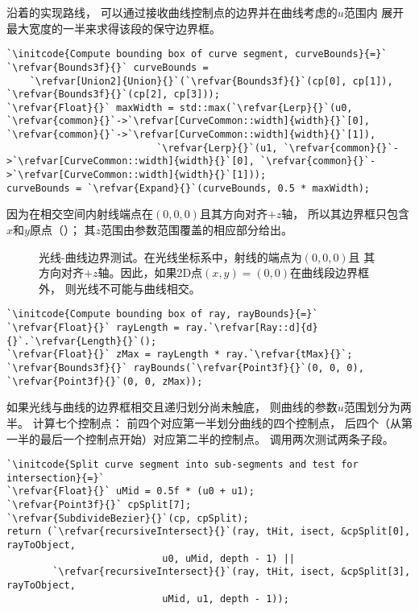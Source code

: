 沿着的实现路线，
可以通过接收曲线控制点的边界并在曲线考虑的$u$范围内
展开最大宽度的一半来求得该段的保守边界框。
\begin{lstlisting}
`\initcode{Compute bounding box of curve segment, curveBounds}{=}`
`\refvar{Bounds3f}{}` curveBounds =
    `\refvar[Union2]{Union}{}`(`\refvar{Bounds3f}{}`(cp[0], cp[1]), `\refvar{Bounds3f}{}`(cp[2], cp[3]));
`\refvar{Float}{}` maxWidth = std::max(`\refvar{Lerp}{}`(u0, `\refvar{common}{}`->`\refvar[CurveCommon::width]{width}{}`[0], `\refvar{common}{}`->`\refvar[CurveCommon::width]{width}{}`[1]),
                          `\refvar{Lerp}{}`(u1, `\refvar{common}{}`->`\refvar[CurveCommon::width]{width}{}`[0], `\refvar{common}{}`->`\refvar[CurveCommon::width]{width}{}`[1]));
curveBounds = `\refvar{Expand}{}`(curveBounds, 0.5 * maxWidth);
\end{lstlisting}

因为在相交空间内射线端点在$(0,0,0)$且其方向对齐$+z$轴，
所以其边界框只包含$x$和$y$原点（）；
其$z$范围由参数范围覆盖的相应部分给出。
\begin{figure}[htbp]
    \centering
    \caption{光线-曲线边界测试。在光线坐标系中，射线的端点为$(0,0,0)$且
        其方向对齐$+z$轴。因此，如果2D点$(x,y)=(0,0)$在曲线段边界框外，
        则光线不可能与曲线相交。}
    \label{fig:3.20}
\end{figure}
\begin{lstlisting}
`\initcode{Compute bounding box of ray, rayBounds}{=}` 
`\refvar{Float}{}` rayLength = ray.`\refvar[Ray::d]{d}{}`.`\refvar{Length}{}`();
`\refvar{Float}{}` zMax = rayLength * ray.`\refvar{tMax}{}`;
`\refvar{Bounds3f}{}` rayBounds(`\refvar{Point3f}{}`(0, 0, 0), `\refvar{Point3f}{}`(0, 0, zMax));
\end{lstlisting}

如果光线与曲线的边界框相交且递归划分尚未触底，
则曲线的参数$u$范围划分为两半。
计算七个控制点：
前四个对应第一半划分曲线的四个控制点，
后四个（从第一半的最后一个控制点开始）对应第二半的控制点。
调用两次测试两条子段。
\begin{lstlisting}
`\initcode{Split curve segment into sub-segments and test for intersection}{=}`
`\refvar{Float}{}` uMid = 0.5f * (u0 + u1);
`\refvar{Point3f}{}` cpSplit[7];
`\refvar{SubdivideBezier}{}`(cp, cpSplit);
return (`\refvar{recursiveIntersect}{}`(ray, tHit, isect, &cpSplit[0], rayToObject,
                           u0, uMid, depth - 1) ||
        `\refvar{recursiveIntersect}{}`(ray, tHit, isect, &cpSplit[3], rayToObject,
                           uMid, u1, depth - 1));  
\end{lstlisting}

